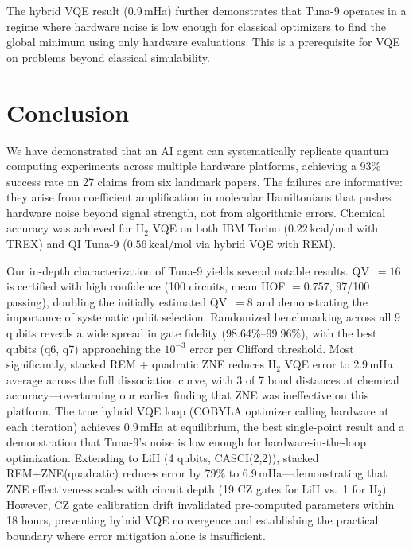 \documentclass[twocolumn,prl,superscriptaddress,nofootinbib]{revtex4-2}
\newcommand{\kcalmol}{\,\text{kcal/mol}}
\begin{document}
The hybrid VQE result (0.9\,mHa) further demonstrates that Tuna-9 operates in a regime where hardware noise is low enough for classical optimizers to find the global minimum using only hardware evaluations.
This is a prerequisite for VQE on problems beyond classical simulability.

\section{Conclusion}
\label{sec:conclusion}

We have demonstrated that an AI agent can systematically replicate quantum computing experiments across multiple hardware platforms, achieving a 93\% success rate on 27 claims from six landmark papers.
The failures are informative: they arise from coefficient amplification in molecular Hamiltonians that pushes hardware noise beyond signal strength, not from algorithmic errors.
Chemical accuracy was achieved for H$_2$ VQE on both IBM Torino ($0.22\kcalmol$ with TREX) and QI Tuna-9 ($0.56\kcalmol$ via hybrid VQE with REM).

Our in-depth characterization of Tuna-9 yields several notable results.
QV~$= 16$ is certified with high confidence (100 circuits, mean HOF $= 0.757$, 97/100 passing), doubling the initially estimated QV~$= 8$ and demonstrating the importance of systematic qubit selection.
Randomized benchmarking across all 9 qubits reveals a wide spread in gate fidelity (98.64\%--99.96\%), with the best qubits (q6, q7) approaching the $10^{-3}$ error per Clifford threshold.
Most significantly, stacked REM + quadratic ZNE reduces H$_2$ VQE error to 2.9\,mHa average across the full dissociation curve, with 3 of 7 bond distances at chemical accuracy---overturning our earlier finding that ZNE was ineffective on this platform.
The true hybrid VQE loop (COBYLA optimizer calling hardware at each iteration) achieves 0.9\,mHa at equilibrium, the best single-point result and a demonstration that Tuna-9's noise is low enough for hardware-in-the-loop optimization.
Extending to LiH (4 qubits, CASCI(2,2)), stacked REM+ZNE(quadratic) reduces error by 79\% to 6.9\,mHa---demonstrating that ZNE effectiveness scales with circuit depth (19 CZ gates for LiH vs.\ 1 for H$_2$).
However, CZ gate calibration drift invalidated pre-computed parameters within 18 hours, preventing hybrid VQE convergence and establishing the practical boundary where error mitigation alone is insufficient.
\end{document}
